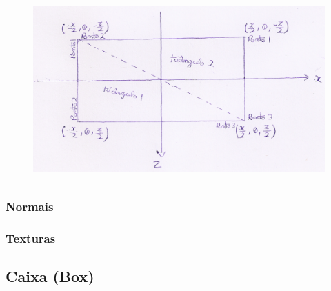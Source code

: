 \documentclass{article}
\begin{document}
\begin{figure}[ht!]
\centering
\includegraphics[height=7cm]{planeMath.png}
\end{figure}

\subsubsection{Normais}

\subsubsection{Texturas}

\subsection{Caixa (Box)}
\end{document}
